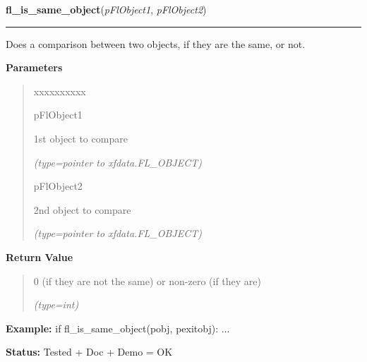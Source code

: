     \vspace{0.5ex}

\hspace{.8\funcindent}\begin{boxedminipage}{\funcwidth}

    \raggedright \textbf{fl\_is\_same\_object}(\textit{pFlObject1}, \textit{pFlObject2})

    \vspace{-1.5ex}

    \rule{\textwidth}{0.5\fboxrule}
\setlength{\parskip}{2ex}
    Does a comparison between two objects, if they are the same, or not.

\setlength{\parskip}{1ex}
      \textbf{Parameters}
      \vspace{-1ex}

      \begin{quote}
        \begin{Ventry}{xxxxxxxxxx}

          \item[pFlObject1]

          1st object to compare

            {\it (type=pointer to xfdata.FL\_OBJECT)}

          \item[pFlObject2]

          2nd object to compare

            {\it (type=pointer to xfdata.FL\_OBJECT)}

        \end{Ventry}

      \end{quote}

      \textbf{Return Value}
    \vspace{-1ex}

      \begin{quote}
      0 (if they are not the same) or non-zero (if they are)

      {\it (type=int)}

      \end{quote}

\textbf{Example:} if fl\_is\_same\_object(pobj, pexitobj): ...



\textbf{Status:} Tested + Doc + Demo = OK



    \end{boxedminipage}



